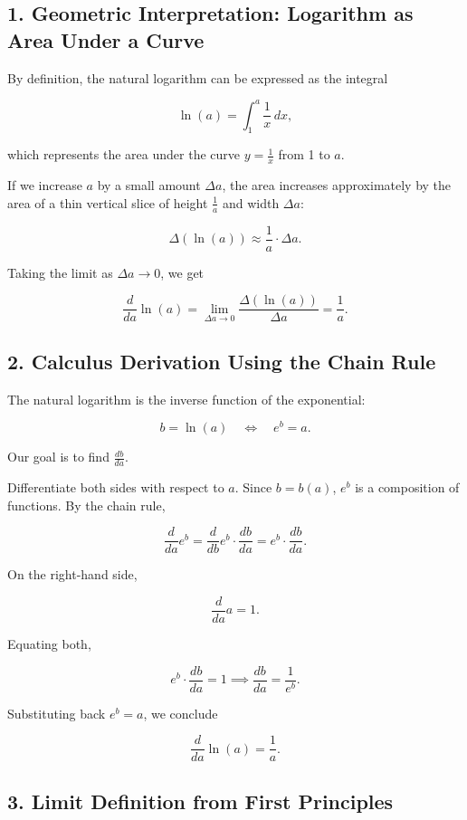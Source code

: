 \documentclass[10pt,twocolumn]{article}
\begin{document}
\subsection*{1. Geometric Interpretation: Logarithm as Area Under a Curve}

By definition, the natural logarithm can be expressed as the integral

\[
\ln(a) = \int_1^a \frac{1}{x} \, dx,
\]

which represents the area under the curve \(y = \frac{1}{x}\) from 1 to \(a\).

If we increase \(a\) by a small amount \(\Delta a\), the area increases approximately by the area of a thin vertical slice of height \(\frac{1}{a}\) and width \(\Delta a\):

\[
\Delta (\ln(a)) \approx \frac{1}{a} \cdot \Delta a.
\]

Taking the limit as \(\Delta a \to 0\), we get

\[
\frac{d}{da} \ln(a) = \lim_{\Delta a \to 0} \frac{\Delta(\ln(a))}{\Delta a} = \frac{1}{a}.
\]

\subsection*{2. Calculus Derivation Using the Chain Rule}

The natural logarithm is the inverse function of the exponential:

\[
b = \ln(a) \quad \iff \quad e^b = a.
\]

Our goal is to find \(\frac{db}{da}\).

Differentiate both sides with respect to \(a\). Since \(b = b(a)\), \(e^b\) is a composition of functions. By the chain rule,

\[
\frac{d}{da} e^b = \frac{d}{db} e^b \cdot \frac{db}{da} = e^b \cdot \frac{db}{da}.
\]

On the right-hand side,

\[
\frac{d}{da} a = 1.
\]

Equating both,

\[
e^b \cdot \frac{db}{da} = 1 \implies \frac{db}{da} = \frac{1}{e^b}.
\]

Substituting back \(e^b = a\), we conclude

\[
\frac{d}{da} \ln(a) = \frac{1}{a}.
\]

\subsection*{3. Limit Definition from First Principles}
\end{document}
